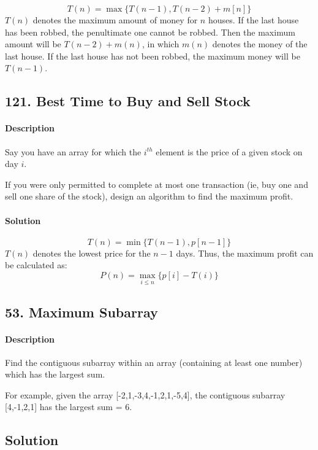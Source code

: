 $$T(n)=\max\{T(n-1),T(n-2)+m[n]\}$$
$T(n)$ denotes the maximum amount of money for $n$ houses. If the last house has been robbed, the penultimate one cannot be robbed. Then the maximum amount will be $T(n-2)+m(n)$, in which $m(n)$ denotes the money of the last house. If the last house has not been robbed, the maximum money will be $T(n-1)$.

\subsection{121. Best Time to Buy and Sell Stock}

\paragraph{Description}

Say you have an array for which the $i^{th}$ element is the price of a given stock on day $i$.

If you were only permitted to complete at most one transaction (ie, buy one and sell one share of the stock), design an algorithm to find the maximum profit.

\paragraph{Solution}

$$T(n)=\min\{T(n-1),p[n-1]\}$$
$T(n)$ denotes the lowest price for the $n-1$ days. Thus, the maximum profit can be calculated as:
$$P(n)=\max_{i\leqslant n}\{p[i]-T(i)\}$$

\subsection{53. Maximum Subarray}

\paragraph{Description}

Find the contiguous subarray within an array (containing at least one number) which has the largest sum.

For example, given the array [-2,1,-3,4,-1,2,1,-5,4],
the contiguous subarray [4,-1,2,1] has the largest sum = 6.

\subsection{Solution}

